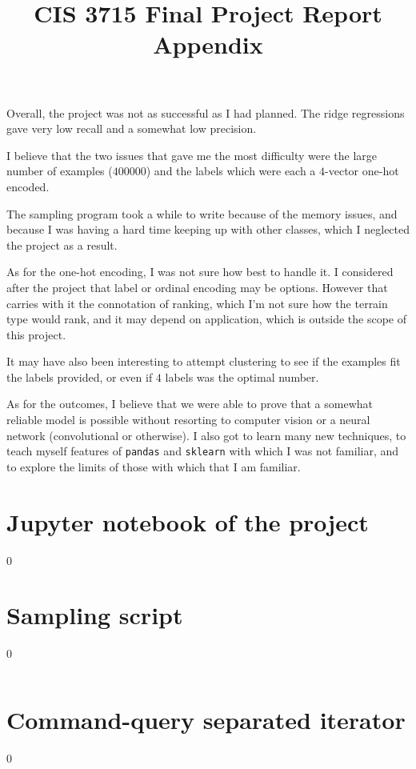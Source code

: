 \documentclass[11pt]{report}
\let\oldpart\part%
\renewcommand*\part[1]{\oldpart{#1}\setcounter{section}0}%
\begin{document}
Overall, the project was not as successful as I had planned.
The ridge regressions gave very low recall and a somewhat low precision.

I believe that the two issues that gave me the most difficulty were
the large number of examples (\(\num{400000}\))
and the labels which were each a \(4\)-vector one-hot encoded.

The sampling program took a while to write because of the memory issues,
and because I was having a hard time keeping up with other classes,
which I neglected the project as a result.

As for the one-hot encoding,
I was not sure how best to handle it.
I considered after the project that label or ordinal encoding may be options.
However that carries with it the connotation of ranking,
which I'm not sure how the terrain type would rank,
and it may depend on application,
which is outside the scope of this project.

It may have also been interesting to attempt clustering
to see if the examples fit the labels provided,
or even if \(4\) labels was the optimal number.

As for the outcomes,
I believe that we were able to prove that a somewhat reliable model is possible
without resorting to computer vision
or a neural network (convolutional or otherwise).
I also got to learn many new techniques, to teach myself features of \texttt{pandas} and \texttt{sklearn} with which I was not familiar,
and to explore the limits of those with which that I am familiar.

\printbibliography

\newpage
\appendix
\title{CIS 3715 Final Project Report Appendix}

\maketitle

\part{Jupyter notebook of the project}
\graphicspath{{ipynb/}}


\part{Sampling script}
\inputminted{python}{src/sample_dataset.py}

\part{Command-query separated iterator}
\inputminted{python}{src/cqs_iter.py}
\end{document}
